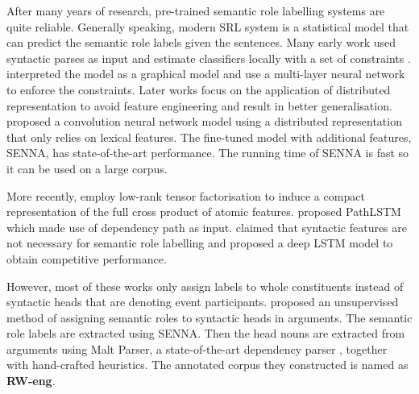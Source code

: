 \documentclass[a4paper]{article}
\begin{document}
After many years of research, pre-trained semantic role labelling systems are quite reliable. Generally speaking, modern SRL system is a statistical model that can predict the semantic role labels given the sentences. Many early work used syntactic parses as input and estimate classifiers locally with a set of constraints \citep{punyakanok2008importance}. \citet{tackstrom2015efficient} interpreted the model as a graphical model and use a multi-layer neural network to enforce the constraints. Later works focus on the application of distributed representation to avoid feature engineering and result in better generalisation. \citet{collobert2007fast, collobert2011natural} proposed a convolution neural network model using a distributed representation that only relies on lexical features. The fine-tuned model with additional features, SENNA, has state-of-the-art performance. The running time of SENNA is fast so it can be used on a large corpus. 

More recently, \citet{lei-EtAl:2015:NAACL-HLT} employ low-rank tensor factorisation to induce a compact representation of the full cross product of atomic features. \citet{roth2016neural} proposed PathLSTM which made use of dependency path as input. \citet{marcheggiani2017simple} claimed that syntactic features are not necessary for semantic role labelling and proposed a deep LSTM model to obtain competitive performance. 

However, most of these works only assign labels to whole constituents instead of syntactic heads that are denoting event participants. \citet{SayeedEtAl2015} proposed an unsupervised method of assigning semantic roles to syntactic heads in arguments. The semantic role labels are extracted using SENNA. Then the head nouns are extracted from arguments using Malt Parser, a state-of-the-art dependency parser \citep{nivre2006maltparser}, together with hand-crafted heuristics. The annotated corpus they constructed is named as \textbf{RW-eng}. 
\end{document}
